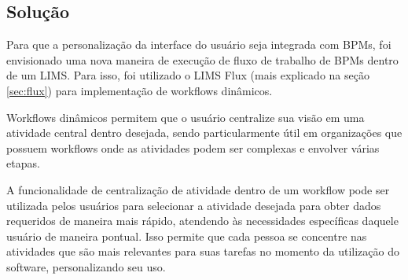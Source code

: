 \subsection{Solução}


Para que a personalização da interface do usuário seja integrada com BPMs, foi envisionado uma nova maneira de execução de fluxo de trabalho de BPMs dentro de um LIMS. Para isso, foi utilizado o LIMS Flux (mais explicado na seção \ref{sec:flux}) para implementação de workflows dinâmicos.

Workflows dinâmicos permitem que o usuário centralize sua visão em uma atividade central dentro desejada, sendo particularmente útil em organizações que possuem workflows onde as atividades podem ser complexas e envolver várias etapas.

A funcionalidade de centralização de atividade dentro de um workflow pode ser utilizada pelos usuários para selecionar a atividade desejada para obter dados requeridos de maneira mais rápido, atendendo às necessidades específicas daquele usuário de maneira pontual. Isso permite que cada pessoa se concentre nas atividades que são mais relevantes para suas tarefas no momento da utilização do software, personalizando seu uso.





